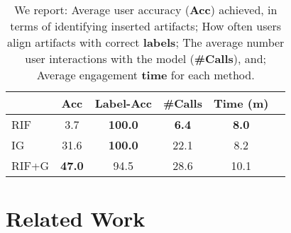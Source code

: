 \documentclass[11pt]{article}
\begin{document}

\begin{table}
\small
\centering
\begin{tabular}{lccccc}
\toprule
&\bf Acc&\bf Label-Acc&\bf \#Calls&\bf Time (m)\\
\midrule
RIF&3.7 & \bf 100.0 &\bf 6.4 &\bf 8.0\\
IG&31.6 & \bf 100.0 & 22.1& 8.2\\
RIF+G& \bf 47.0 & 94.5 & 28.6 & 10.1  \\
\bottomrule
\end{tabular}
\caption{We report: Average user accuracy (\textbf{Acc}) achieved, %
in terms of identifying inserted artifacts; How often users align artifacts with correct \textbf{labels}; The average number user interactions with the model (\textbf{\#Calls}), and; Average engagement \textbf{time} for each method.}  %
\label{tab:user-study}
    \minipostspace{}
\end{table}
\section{Related Work}
\vspace{-0.5em}
\end{document}
